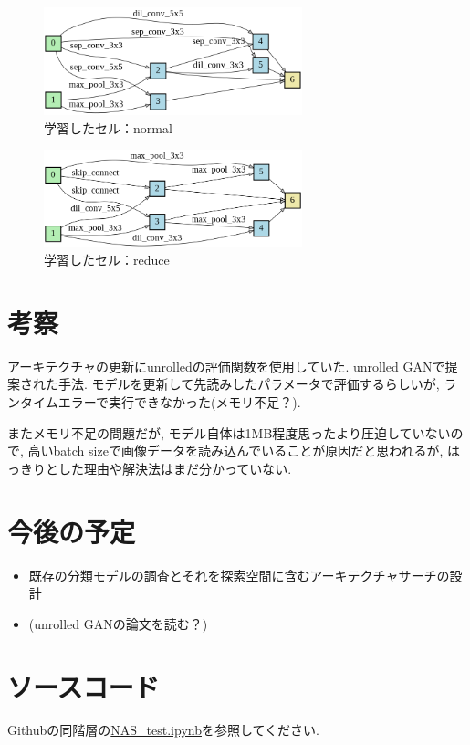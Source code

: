 \documentclass[twocolumn]{jarticle}     %
\begin{document}
\begin{figure}[t]
	\begin{center}
		\includegraphics[clip,width=7.5cm]{epoch25_normal.png}
		\caption{学習したセル：normal}
		\label{fig:nor}
	\end{center}
\end{figure}
\begin{figure}[t]
	\begin{center}
		\includegraphics[clip,width=7.5cm]{epoch25_reduce.png}
		\caption{学習したセル：reduce}
		\label{fig:red}
	\end{center}
\end{figure}


\section{考察}
アーキテクチャの更新にunrolledの評価関数を使用していた. unrolled GANで提案された手法.
モデルを更新して先読みしたパラメータで評価するらしいが, ランタイムエラーで実行できなかった(メモリ不足？).

またメモリ不足の問題だが, モデル自体は1MB程度思ったより圧迫していないので, 高いbatch sizeで画像データを読み込んでいることが原因だと思われるが, はっきりとした理由や解決法はまだ分かっていない.

\section{今後の予定}
\begin{itemize}
  \item 既存の分類モデルの調査とそれを探索空間に含むアーキテクチャサーチの設計
  \item (unrolled GANの論文を読む？)
\end{itemize}

\section{ソースコード}
Githubの同階層の\url{NAS_test.ipynb}を参照してください.



\end{document}
